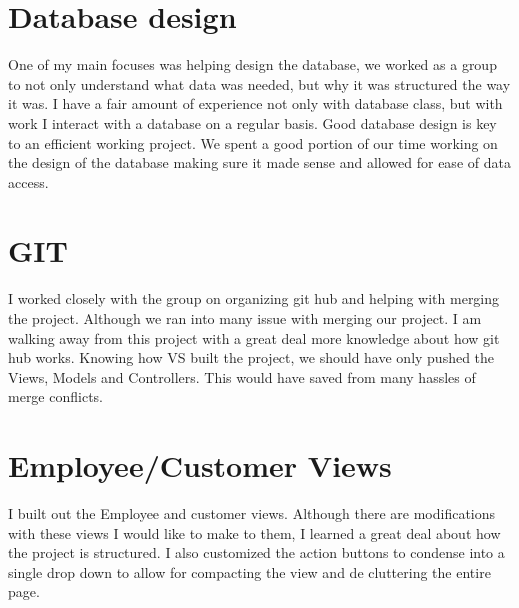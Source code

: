 \documentclass[]{article}
\title{}
\author{}
\begin{document}
\maketitle

\section{Database design}
One of my main focuses was helping design the database, we worked as a group to not only understand what data was needed, but why it was structured the way it was.  I have a fair amount of experience not only with database class, but with work I interact with a database on a regular basis.  Good database design is key to an efficient working project.  We spent a good portion of our time working on the design of the database making sure it made sense and allowed for ease of data access.

\section{GIT}
I worked closely with the group on organizing git hub and helping with merging the project.  Although we ran into many issue with merging our project.  I am walking away from this project with a great deal more knowledge about how git hub works.  Knowing how VS built the project, we should have only pushed the Views, Models and Controllers.  This would have saved from many hassles of merge conflicts.

\section{Employee/Customer Views}
I built out the Employee and customer views.  Although there are modifications with these views I would like to make to them, I learned a great deal about how the project is structured.  I also customized the action buttons to condense into a single drop down to allow for compacting the view and de cluttering the entire page.
\end{document}
